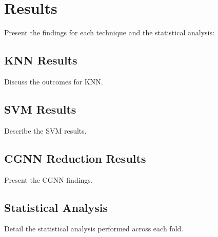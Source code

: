 \section{Results}
Present the findings for each technique and the statistical analysis:
\subsection{KNN Results}
Discuss the outcomes for KNN.

\subsection{SVM Results}
Describe the SVM results.

\subsection{CGNN Reduction Results}
Present the CGNN findings.

\subsection{Statistical Analysis}
Detail the statistical analysis performed across each fold.
